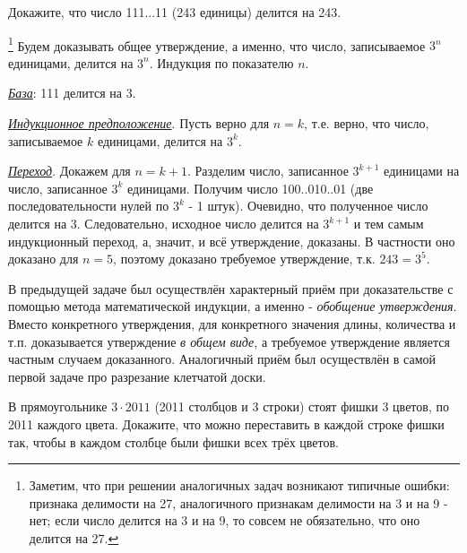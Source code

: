 \newpage

\begin{thm}
Докажите, что число 111...11 (243 единицы) делится на 243.
\end{thm}

\begin{prf}\footnote{Заметим, что при решении аналогичных задач возникают типичные ошибки: признака делимости на 27, аналогичного признакам делимости на 3 и на 9 - нет; если число делится на 3 и на 9, то совсем не обязательно, что оно делится на 27.}
Будем доказывать общее утверждение, а именно, что число, записываемое $3^n$ единицами, делится на $3^n$. Индукция по показателю $n$.
\par
\textit{\underline{База}}: 111 делится на 3.  
\par
\textit{\underline{Индукционное предположение}}. Пусть верно для $n = k$, т.е. верно, что число, записываемое $k$ единицами, делится на $3^k$.
\par
\textit{\underline{Переход}}. Докажем для $n = k + 1$. Разделим число, записанное $3^{k+1}$ единицами на число, записанное $3^k$ единицами. Получим число 100..010..01 (две последовательности нулей по $3^k$ - 1 штук). Очевидно, что полученное число делится на 3. Следовательно, исходное число делится на $3^{k+1}$ и тем самым индукционный переход, а, значит, и всё утверждение, доказаны. В частности оно доказано для $n = 5$, поэтому доказано требуемое утверждение, т.к. $243 = 3^5$.
\end{prf}

В предыдущей задаче был осуществлён характерный приём при доказательстве с помощью метода математической индукции, а именно - \textit{обобщение утверждения}. Вместо конкретного утверждения, для конкретного значения длины, количества и т.п. доказывается утверждение \textit{в общем виде}, а требуемое утверждение является частным случаем доказанного. Аналогичный приём был осуществлён в самой первой задаче про разрезание клетчатой доски.

\begin{thm}
В прямоугольнике $3 \cdot 2011$ (2011 столбцов и 3 строки) стоят фишки 3 цветов, по 2011 каждого цвета. Докажите, что можно переставить в каждой строке фишки так, чтобы в каждом столбце были фишки всех трёх цветов.
\end{thm}

